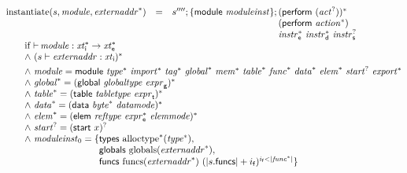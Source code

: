 $$
\begin{array}[t]{@{}lcl@{}l@{}}
{\mathrm{instantiate}}(s, {\mathit{module}}, {{\mathit{externaddr}}^\ast}) & = & {s''''} ; \{ \mathsf{module}~{\mathit{moduleinst}} \} ; \begin{array}[t]{@{}l@{}} {(\mathsf{perform}~({{\mathit{act}}^?}))^\ast} \\
  (\mathsf{perform}~{{\mathit{action}}^\ast}) \\
  {{\mathit{instr}}_{\mathsf{e}}^\ast}~{{\mathit{instr}}_{\mathsf{d}}^\ast}~{{\mathit{instr}}_{\mathsf{s}}^?} \end{array} &  \\
 \multicolumn{4}{@{}l@{}}{\quad
\quad
\begin{array}[t]{@{}l@{}}
\mbox{if}~ {\vdash}\, {\mathit{module}} : {{\mathit{xt}}_{\mathsf{i}}^\ast} \rightarrow {{\mathit{xt}}_{\mathsf{e}}^\ast} \\
{\land}~ (s \vdash {\mathit{externaddr}} : {\mathit{xt}}_{\mathsf{i}})^\ast \\[0.8ex]
{\land}~ {\mathit{module}} = \mathsf{module}~{{\mathit{type}}^\ast}~{{\mathit{import}}^\ast}~{{\mathit{tag}}^\ast}~{{\mathit{global}}^\ast}~{{\mathit{mem}}^\ast}~{{\mathit{table}}^\ast}~{{\mathit{func}}^\ast}~{{\mathit{data}}^\ast}~{{\mathit{elem}}^\ast}~{{\mathit{start}}^?}~{{\mathit{export}}^\ast} \\
{\land}~ {{\mathit{global}}^\ast} = {(\mathsf{global}~{\mathit{globaltype}}~{\mathit{expr}}_{\mathsf{g}})^\ast} \\
{\land}~ {{\mathit{table}}^\ast} = {(\mathsf{table}~{\mathit{tabletype}}~{\mathit{expr}}_{\mathsf{t}})^\ast} \\
{\land}~ {{\mathit{data}}^\ast} = {(\mathsf{data}~{{\mathit{byte}}^\ast}~{\mathit{datamode}})^\ast} \\
{\land}~ {{\mathit{elem}}^\ast} = {(\mathsf{elem}~{\mathit{reftype}}~{{\mathit{expr}}_{\mathsf{e}}^\ast}~{\mathit{elemmode}})^\ast} \\
{\land}~ {{\mathit{start}}^?} = {(\mathsf{start}~x)^?} \\
{\land}~ {\mathit{moduleinst}}_0 = \{ \begin{array}[t]{@{}l@{}}
\mathsf{types}~{{{\mathrm{alloctype}}^\ast}}{({{\mathit{type}}^\ast})},\; \\
  \mathsf{globals}~{\mathrm{globals}}({{\mathit{externaddr}}^\ast}),\; \\
  \mathsf{funcs}~{\mathrm{funcs}}({{\mathit{externaddr}}^\ast})~{({|s{.}\mathsf{funcs}|} + i_{\mathsf{f}})^{i_{\mathsf{f}}<{|{{\mathit{func}}^\ast}|}}} \}\end{array} \\

\end{array}}
\end{array}$$
